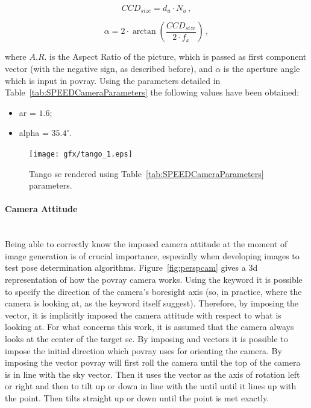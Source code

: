\begin{equation}
  CCD_{size} = d_u \cdot N_u \,,
\end{equation}

\begin{equation}
  \alpha = 2 \cdot \arctan{\left( \frac{CCD_{size}}{2 \cdot f_x} \right)} \,,
\end{equation}

where $A.R.$ is the Aspect Ratio of the picture, which is passed as first component  vector (with the negative sign, as described before), and $\alpha$ is the aperture angle which is input in \acrshort{povray}.
Using the parameters detailed in Table~\ref{tab:SPEEDCameraParameters} the following values have been obtained:

\begin{itemize}
  \item \gls{ar} = $1.6$;
  \item \gls{alpha} = $35.4 ^{\circ}$.
\end{itemize}

\begin{figure}[htbp]
  \centering
  \texttt{[image: gfx/tango\_1.eps]}
  \caption{Tango \acrshort{sc} rendered using Table~\ref{tab:SPEEDCameraParameters} parameters.}
  \label{fig:tangoNoNoise}
\end{figure}

\paragraph{Camera Attitude}\mbox{}\\
Being able to correctly know the imposed camera attitude at the moment of image generation is of crucial importance, especially when developing images to test pose determination algorithms. Figure~\ref{fig:perspcam} gives a \acrshort{3d} representation of how the \acrshort{povray} camera works. Using the  keyword it is possible to specify the direction of the camera's boresight axis (so, in practice, where the camera is looking at, as the keyword itself suggest). Therefore, by imposing the  vector, it is implicitly imposed the camera attitude with respect to what is looking at. For what concerns this work, it is assumed that the camera always looks at the center of the target \acrshort{sc}.
By imposing  and  vectors it is possible to impose the initial direction which \acrshort{povray} uses for orienting the camera.
By imposing the  vector \acrshort{povray} will first roll the camera until the top of the camera is in line with the sky vector. Then it uses the  vector as the axis of rotation left or right and then to tilt up or down in line with the  until until it lines up with the  point. Then tilts straight up or down until the  point is met exactly.

